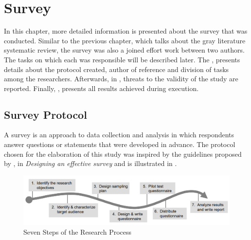 
\chapter{Survey}\label{survey}

In this chapter, more detailed information is presented about the survey that was conducted. Similar to the previous chapter, which talks about the gray literature systematic review, the survey was also a joined effort work between two authors. The tasks on which each was responsible will be described later. The , presents details about the protocol created, author of reference and division of tasks among the researchers. Afterwards, in , threats to the validity of the study are reported. Finally, , presents all results achieved during execution.

\section{Survey Protocol}\label{sec:survey-protocol}

A survey is an approach to data collection and analysis in which respondents answer questions or statements that were developed in advance. The protocol chosen for the elaboration of this study was inspired by the guidelines proposed by , in \textit{Designing an effective survey} and is illustrated in .

\begin{figure}[!htb]
  \caption{Seven Steps of the Research Process}\label{fig:setepassos}
  \begin{center}
    \includegraphics[width=16cm]{img/kasunic_process.png}
  \end{center}
\end{figure}

